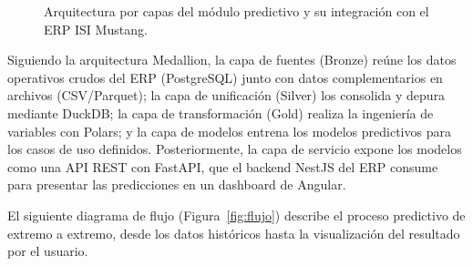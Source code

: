 \documentclass{univalle-perfil}
\begin{document}
\begin{figure}[H]
{
}
\caption{Arquitectura por capas del módulo predictivo y su integración con el ERP ISI Mustang.}
\label{fig:arquitectura}
\end{figure}

Siguiendo la arquitectura Medallion, la capa de fuentes (Bronze) reúne los datos operativos crudos del ERP (PostgreSQL) junto con datos complementarios en archivos (CSV/Parquet); la capa de unificación (Silver) los consolida y depura mediante DuckDB; la capa de transformación (Gold) realiza la ingeniería de variables con Polars; y la capa de modelos entrena los modelos predictivos para los casos de uso definidos. Posteriormente, la capa de servicio expone los modelos como una API REST con FastAPI, que el backend NestJS del ERP consume para presentar las predicciones en un dashboard de Angular.

El siguiente diagrama de flujo (Figura~\ref{fig:flujo}) describe el proceso predictivo de extremo a extremo, desde los datos históricos hasta la visualización del resultado por el usuario.
\end{document}
